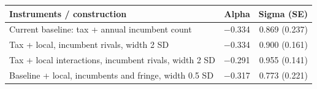 \documentclass[10pt,]{article}
\begin{document}
\begin{longtable}[]{@{}lrr@{}}
\toprule
\begin{minipage}[b]{0.61\columnwidth}\raggedright\strut
Instruments / construction\strut
\end{minipage} & \begin{minipage}[b]{0.12\columnwidth}\raggedleft\strut
Alpha\strut
\end{minipage} & \begin{minipage}[b]{0.19\columnwidth}\raggedleft\strut
Sigma (SE)\strut
\end{minipage}\tabularnewline
\midrule
\endhead
\begin{minipage}[t]{0.61\columnwidth}\raggedright\strut
Current baseline: tax + annual incumbent count\strut
\end{minipage} & \begin{minipage}[t]{0.12\columnwidth}\raggedleft\strut
−0.334\strut
\end{minipage} & \begin{minipage}[t]{0.19\columnwidth}\raggedleft\strut
0.869 (0.237)\strut
\end{minipage}\tabularnewline
\begin{minipage}[t]{0.61\columnwidth}\raggedright\strut
Tax + local, incumbent rivals, width 2 SD\strut
\end{minipage} & \begin{minipage}[t]{0.12\columnwidth}\raggedleft\strut
−0.334\strut
\end{minipage} & \begin{minipage}[t]{0.19\columnwidth}\raggedleft\strut
0.900 (0.161)\strut
\end{minipage}\tabularnewline
\begin{minipage}[t]{0.61\columnwidth}\raggedright\strut
Tax + local interactions, incumbent rivals, width 2 SD\strut
\end{minipage} & \begin{minipage}[t]{0.12\columnwidth}\raggedleft\strut
−0.291\strut
\end{minipage} & \begin{minipage}[t]{0.19\columnwidth}\raggedleft\strut
0.955 (0.141)\strut
\end{minipage}\tabularnewline
\begin{minipage}[t]{0.61\columnwidth}\raggedright\strut
Baseline + local, incumbents and fringe, width 0.5 SD\strut
\end{minipage} & \begin{minipage}[t]{0.12\columnwidth}\raggedleft\strut
−0.317\strut
\end{minipage} & \begin{minipage}[t]{0.19\columnwidth}\raggedleft\strut
0.773 (0.221)\strut
\end{minipage}\tabularnewline
\bottomrule
\end{longtable}
\end{document}
